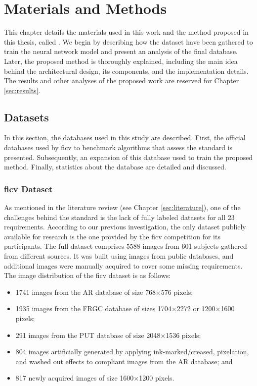 \section{Materials and Methods} \label{sec:method}
 
This chapter details the materials used in this work and the method proposed in this thesis, called \methodname. We begin by describing how the dataset have been gathered to train the neural network model and present an analysis of the final database. Later, the proposed method is thoroughly explained, including the main idea behind the architectural design, its components, and the implementation details. The results and other analyses of the proposed work are reserved for Chapter \ref{sec:results}.
 
\subsection{Datasets}
 
In this section, the databases used in this study are described. First, the official databases used by \acs{ficv} to benchmark algorithms that assess the \icao standard is presented. Subsequently, an expansion of this database used to train the proposed method. Finally, statistics about the database are detailed and discussed.
 
\subsubsection{\acs{ficv} Dataset} \label{sec:database}
 
As mentioned in the literature review (see Chapter \ref{sec:literature}), one of the challenges behind the \icao standard is the lack of fully labeled datasets for all 23 requirements. According to our previous investigation, the only dataset publicly available for research is the one provided by the \acs{ficv} competition for its participants. The full dataset comprises 5588 images from 601 subjects gathered from different sources. It was built \adhoc using images from public databases, and additional images were manually acquired to cover some missing requirements. The image distribution of the \acs{ficv} dataset is as follows:
 
\begin{itemize}
\item 1741 images from the AR database \citep{martinez1998ar} of size 768$\times$576 pixels;
\item 1935 images from the FRGC database \citep{databaseFRGC} of sizes 1704$\times$2272 or 1200$\times$1600 pixels;
\item 291 images from the PUT database \citep{kasinski2008put} of size 2048$\times$1536 pixels;
\item 804 images artificially generated by applying ink-marked/creased, pixelation, and washed out effects to compliant images from the AR database; and
\item 817 newly acquired images of size 1600$\times$1200 pixels.
\end{itemize}
 
